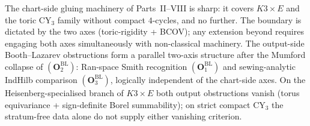 The chart-side gluing machinery of Parts~II--VIII is sharp: it covers
$K3 \times E$ and the toric CY$_3$ family without compact $4$-cycles,
and no further. The boundary is dictated by the two axes
(toric-rigidity + BCOV); any extension beyond requires engaging both
axes simultaneously with non-classical machinery. The output-side
Booth--Lazarev obstructions form a parallel two-axis structure after
the Mumford collapse of $(\mathbf{O}_2^{\mathrm{BL}})$: Ran-space
Smith recognition $(\mathbf{O}_1^{\mathrm{BL}})$ and sewing-analytic
IndHilb comparison $(\mathbf{O}_3^{\mathrm{BL}})$, logically
independent of the chart-side axes. On the Heisenberg-specialised
branch of $K3 \times E$ both output obstructions vanish (torus
equivariance + sign-definite Borel summability); on strict compact
CY$_3$ the stratum-free data alone do not supply either vanishing
criterion.
